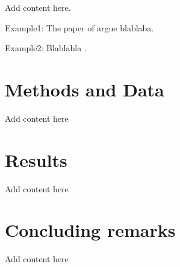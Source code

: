 \documentclass[12pt,twoside]{article}
\begin{document}
Add content here.


Example1: The paper of \cite{Acemoglu2010} argue blablaba.


Example2: Blablabla \citep{Acemoglu2010}.



\section{Methods and Data}

Add content here


\section{Results}

Add content here


\section{Concluding remarks}

Add content here




{\small


}
\end{document}
